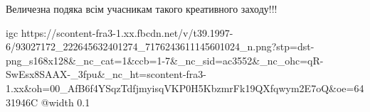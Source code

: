  
 
 
 
 

\qqSecCmt


Величезна подяка всім учасникам такого креативного заходу!!!


\ifcmt
  igc https://scontent-fra3-1.xx.fbcdn.net/v/t39.1997-6/93027172_222645632401274_7176243611145601024_n.png?stp=dst-png_s168x128&_nc_cat=1&ccb=1-7&_nc_sid=ac3552&_nc_ohc=qR-SwEsx8SAAX-_3fpu&_nc_ht=scontent-fra3-1.xx&oh=00_AfB6f4YSqzTdfjmyisqVKP0H5KbzmrFk19QXfqwym2E7oQ&oe=6431946C
	@width 0.1
\fi
